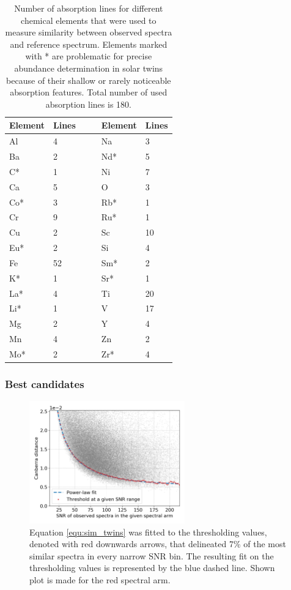 \begin{table}
	\centering
	\caption{Number of absorption lines for different chemical elements that were used to measure similarity between observed spectra and reference spectrum. Elements marked with * are problematic for precise abundance determination in solar twins because of their shallow or rarely noticeable absorption features. Total number of used absorption lines is 180.}
	\begin{tabular}{l l c | c l l }
		\hline
		Element & Lines & & & Element & Lines\\ 
		\hline
		Al & 4 & & & Na & 3\\ 
		Ba & 2 & & & Nd* & 5\\ 
		C* & 1 & & & Ni & 7\\ 
		Ca & 5 & & & O & 3 \\ 
		Co* & 3 & & & Rb* & 1\\ 
		Cr & 9 & & & Ru* & 1\\ 
		Cu & 2 & & & Sc & 10\\ 
		Eu* & 2 & & & Si & 4\\ 
		Fe & 52 & & & Sm* & 2\\ 
		K* & 1 & & & Sr* & 1\\ 
		La* & 4 & & & Ti & 20\\ 
		Li* & 1 & & & V & 17\\ 
		Mg & 2 & & & Y & 4\\ 
		Mn & 4 & & & Zn & 2\\ 
		Mo* & 2 & & & Zr* & 4 \\ 
		\hline
	\end{tabular}
	\label{tab:elements_list}
\end{table}

\subsubsection{Best candidates}
\begin{figure}
	\centering
	\includegraphics[width=0.6\textwidth]{canberra_b3_07_envelope.png}
	\caption{Equation \ref{equ:sim_twins} was fitted to the thresholding values, denoted with red downwards arrows, that delineated 7\% of the most similar spectra in every narrow SNR bin. The resulting fit on the thresholding values is represented by the blue dashed line. Shown plot is made for the red spectral arm.}
	\label{fig:envelope_fit_twins}
\end{figure}

